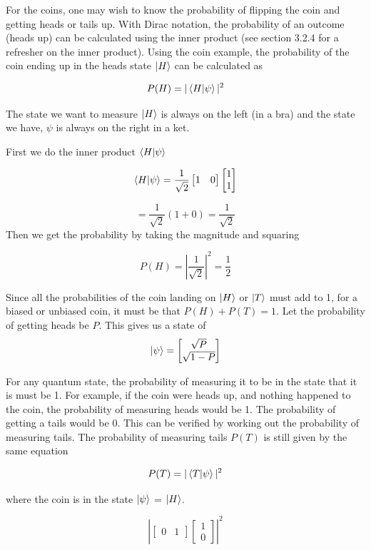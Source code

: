 For the coins, one may wish to know the probability of flipping the coin and getting heads or tails up. With Dirac notation, the probability of an outcome (heads up) can be calculated using the inner product (see section 3.2.4 for a refresher on the inner product). Using the coin example, the probability of the coin ending up in the heads state $\ket{H}$ can be calculated as

$$ P(H) = |\braket{H|\psi}|^2  $$

The state we want to measure $\ket{H}$ is always on the left (in a bra) and the state we have, $\psi$ is always on the right in a ket.

First we do the inner product $\braket{H|\psi}$

$$ \braket{H|\psi} = \frac{1}{\sqrt{2}}\begin{bmatrix} 1 & 0 \end{bmatrix} \begin{bmatrix} 1 \\ 1 \end{bmatrix} $$

$$ = \frac{1}{\sqrt{2}} (1 + 0 ) = \frac{1}{\sqrt{2}} $$
Then we get the probability by taking the magnitude and squaring 

$$ P(H) = \left| \frac{1}{\sqrt{2}} \right|^2 = \frac{1}{2} $$

Since all the probabilities of the coin landing on $\ket{H}$ or $\ket{T}$ must add to 1, for a biased or unbiased coin, it must be that $P(H) + P(T) = 1$. Let the probability of getting heads be $P$. This gives us a state of 
$$
\ket{\psi} = \begin{bmatrix} \sqrt{P} \\ \sqrt{1-P} \end{bmatrix}
$$

For any quantum state, the probability of measuring it to be in the state that it is must be 1. For example, if the coin were heads up, and nothing happened to the coin, the probability of measuring heads would be 1. The probability of getting a tails would be 0. This can be verified by working out the probability of measuring tails. The probability of measuring tails $P(T)$ is still given by the same equation 

$$ P(T) = |\braket{T|\psi}|^2 $$ 

where the coin is in the state $\ket{\psi}$ = $\ket{H}$. 

$$  
\left| \begin{bmatrix} 0 & 1 \end{bmatrix} \begin{bmatrix} 1 \\ 0 \end{bmatrix} \right|^2 
$$

